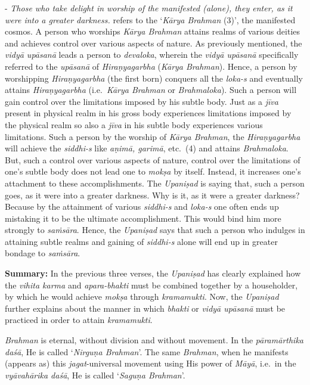 - \emph{Those who take delight in worship of the manifested (alone), they enter, as it were into a greater darkness.}  refers to the `\emph{Kārya Brahman} (3)', the manifested cosmos. A person who worships \emph{Kārya Brahman} attains realms of various deities and achieves control over various aspects of nature. As previously mentioned, the \emph{vidyā upāsanā} leads a person to \emph{devaloka}, wherein the \emph{vidyā upāsanā} specifically referred to the \emph{upāsanā} of \emph{Hiraṇyagarbha} (\emph{Kārya Brahman}). Hence, a person by worshipping \emph{Hiraṇyagarbha} (the first born) conquers all the \emph{loka-s} and eventually attains \emph{Hiraṇyagarbha} (i.e.\ \emph{Kārya Brahman} or \emph{Brahmaloka}). Such a person will gain control over the limitations imposed by his subtle body. Just as a \emph{jīva} present in physical realm in his gross body experiences limitations imposed by the physical realm so also a \emph{jīva} in his subtle body experiences various limitations. Such a person by the worship of \emph{Kārya Brahman}, the \emph{Hiraṇyagarbha} will achieve the \emph{siddhi-s} like \emph{aṇimā, garimā}, etc.\ (4) and attains \emph{Brahmaloka}. But, such a control over various aspects of nature, control over the limitations of one's subtle body does not lead one to \emph{mokṣa} by itself. Instead, it increases one's attachment to these accomplishments. The \emph{Upaniṣad} is saying that, such a person goes, as it were into a greater darkness. Why is it, as it were a greater darkness? Because by the attainment of various \emph{siddhi-s} and \emph{loka-s} one often ends up mistaking it to be the ultimate accomplishment. This would bind him more strongly to \emph{saṁsāra}. Hence, the \emph{Upaniṣad} says that such a person who indulges in attaining subtle realms and gaining of \emph{siddhi-s} alone will end up in greater bondage to \emph{saṁsāra}.

\textbf{Summary:} In the previous three verses, the \emph{Upaniṣad} has clearly explained how the \emph{vihita karma} and \emph{apara-bhakti} must be combined together by a householder, by which he would achieve \emph{mokṣa} through \emph{kramamukti}. Now, the \emph{Upaniṣad} further explains about the manner in which \emph{bhakti} or \emph{vidyā upāsanā} must be practiced in order to attain \emph{kramamukti}.

\emph{Brahman} is eternal, without division and without movement. In the \emph{pāramārthika daśā}, He is called `\emph{Nirguṇa Brahman}'. The same \emph{Brahman}, when he manifests (appears as) this \emph{jagat}-universal movement using His power of \emph{Māyā}, i.e.\ in the \emph{vyāvahārika daśā}, He is called `\emph{Saguṇa Brahman}'.

